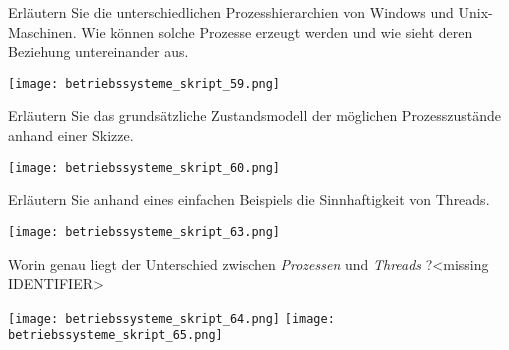 \documentclass{article}
\begin{document}
\begin{tcolorbox}[colback=white!10!white,colframe=lightgray!75!black,
  savelowerto=\jobname_ex.tex,breakable,enhanced,lines before break=40]

\begin{center}
Erläutern Sie die unterschiedlichen Prozesshierarchien von Windows und Unix-Maschinen.
Wie können solche Prozesse erzeugt werden und wie sieht deren Beziehung untereinander aus.

\end{center}

\tcblower

\justifying
\texttt{[image: betriebssysteme\_skript\_59.png]}

\end{tcolorbox}
\begin{tcolorbox}[colback=white!10!white,colframe=lightgray!75!black,
  savelowerto=\jobname_ex.tex,breakable,enhanced,lines before break=40]

\begin{center}
Erläutern Sie das grundsätzliche Zustandsmodell der möglichen Prozesszustände anhand einer Skizze.

\end{center}

\tcblower

\justifying
\texttt{[image: betriebssysteme\_skript\_60.png]}

\end{tcolorbox}
\begin{tcolorbox}[colback=white!10!white,colframe=lightgray!75!black,
  savelowerto=\jobname_ex.tex,breakable,enhanced,lines before break=40]

\begin{center}
Erläutern Sie anhand eines einfachen Beispiels die Sinnhaftigkeit von Threads.

\end{center}

\tcblower

\justifying
\texttt{[image: betriebssysteme\_skript\_63.png]}

\end{tcolorbox}
\begin{tcolorbox}[colback=white!10!white,colframe=lightgray!75!black,
  savelowerto=\jobname_ex.tex,breakable,enhanced,lines before break=40]

\begin{center}
Worin genau liegt der Unterschied zwischen 
\textit{Prozessen
} und 
\textit{Threads
}?<missing IDENTIFIER>

\end{center}

\tcblower

\justifying
\texttt{[image: betriebssysteme\_skript\_64.png]}
\texttt{[image: betriebssysteme\_skript\_65.png]}

\end{tcolorbox}
\end{document}

